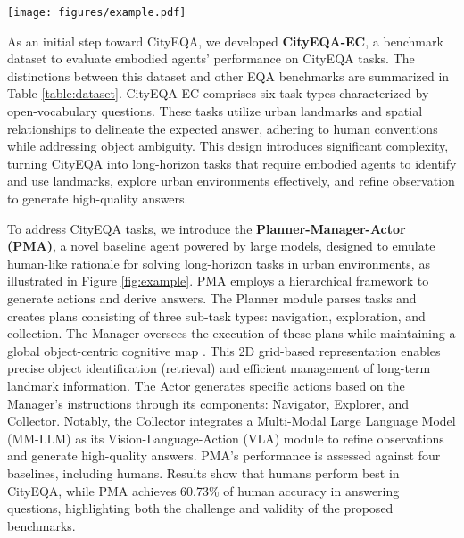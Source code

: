 \begin{figure*}[!htb]
\centering
    \texttt{[image: figures/example.pdf]}
\caption{The typical workflow of the PMA to address City EQA tasks. There are two cars in this area, thus a valid question must contain landmarks and spatial relationships to specify a car. Given the task, PMA will sequentially complete multiple sub-tasks to find the answer.}
\label{fig:example}
\end{figure*}

As an initial step toward CityEQA, we developed \textbf{CityEQA-EC}, a benchmark dataset to evaluate embodied agents' performance on CityEQA tasks. The distinctions between this dataset and other EQA benchmarks are summarized in Table \ref{table:dataset}. CityEQA-EC comprises six task types characterized by open-vocabulary questions. These tasks utilize urban landmarks and spatial relationships to delineate the expected answer, adhering to human conventions while addressing object ambiguity. This design introduces significant complexity, turning CityEQA into long-horizon tasks that require embodied agents to identify and use landmarks, explore urban environments effectively, and refine observation to generate high-quality answers.

To address CityEQA tasks, we introduce the \textbf{Planner-Manager-Actor (PMA)}, a novel baseline agent powered by large models, designed to emulate human-like rationale for solving long-horizon tasks in urban environments, as illustrated in Figure \ref{fig:example}. PMA employs a hierarchical framework to generate actions and derive answers. The Planner module parses tasks and creates plans consisting of three sub-task types: navigation, exploration, and collection. The Manager oversees the execution of these plans while maintaining a global object-centric cognitive map \cite{deng2024opengraph}. This 2D grid-based representation enables precise object identification (retrieval) and efficient management of long-term landmark information. The Actor generates specific actions based on the Manager's instructions through its components: Navigator, Explorer, and Collector. Notably, the Collector integrates a Multi-Modal Large Language Model (MM-LLM) as its Vision-Language-Action (VLA) module to refine observations and generate high-quality answers.
PMA's performance is assessed against four baselines, including humans. 
Results show that humans perform best in CityEQA, while PMA achieves 60.73\% of human accuracy in answering questions, highlighting both the challenge and validity of the proposed benchmarks. 

